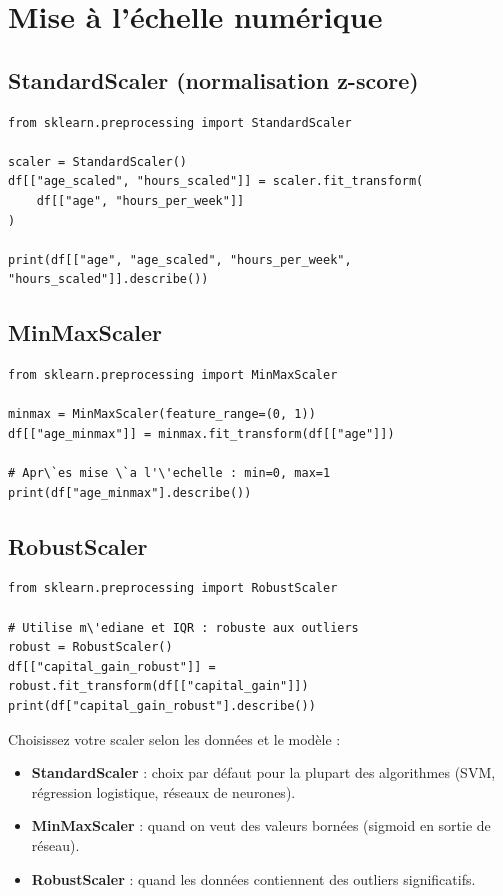 \section{Mise \`a l'\'echelle num\'erique}

\subsection{StandardScaler (normalisation z-score)}

\begin{verbatim}
from sklearn.preprocessing import StandardScaler

scaler = StandardScaler()
df[["age_scaled", "hours_scaled"]] = scaler.fit_transform(
    df[["age", "hours_per_week"]]
)

print(df[["age", "age_scaled", "hours_per_week", "hours_scaled"]].describe())
\end{verbatim}

\subsection{MinMaxScaler}

\begin{verbatim}
from sklearn.preprocessing import MinMaxScaler

minmax = MinMaxScaler(feature_range=(0, 1))
df[["age_minmax"]] = minmax.fit_transform(df[["age"]])

# Apr\`es mise \`a l'\'echelle : min=0, max=1
print(df["age_minmax"].describe())
\end{verbatim}

\subsection{RobustScaler}

\begin{verbatim}
from sklearn.preprocessing import RobustScaler

# Utilise m\'ediane et IQR : robuste aux outliers
robust = RobustScaler()
df[["capital_gain_robust"]] = robust.fit_transform(df[["capital_gain"]])
print(df["capital_gain_robust"].describe())
\end{verbatim}

\begin{preprocesstip}
Choisissez votre scaler selon les donn\'ees et le mod\`ele :
\begin{itemize}
  \item \textbf{StandardScaler} : choix par d\'efaut pour la plupart des algorithmes (SVM, r\'egression logistique, r\'eseaux de neurones).
  \item \textbf{MinMaxScaler} : quand on veut des valeurs born\'ees (sigmoid en sortie de r\'eseau).
  \item \textbf{RobustScaler} : quand les donn\'ees contiennent des outliers significatifs.
\end{itemize}
\end{preprocesstip}

